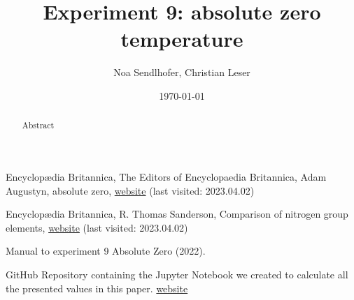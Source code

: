 \documentclass[12pt,a4paper]{article}
\title{Experiment 9: absolute zero temperature}
\author{Noa Sendlhofer, Christian Leser}
\date{\today}
\begin{document}
\maketitle

\begin{abstract}
    Abstract
\end{abstract}

\tableofcontents





\newpage










\begin{thebibliography}{99}

Encyclop\ae dia Britannica, The Editors of Encyclopaedia Britannica, Adam Augustyn, absolute zero, \href{https://www.britannica.com/science/absolute-zero}{website} (last visited: 2023.04.02)

Encyclop\ae dia Britannica, R. Thomas Sanderson, Comparison of nitrogen group elements, \href{https://www.britannica.com/science/nitrogen-group-element/Comparison-of-nitrogen-group-elements}{website} (last visited: 2023.04.02)

Manual to experiment 9 Absolute Zero (2022).

GitHub Repository containing the Jupyter Notebook we created to calculate all the presented values in this paper. \href{https://github.com/Noothless/Physik-Absolute-Zero}{website}

\end{thebibliography}
\end{document}
